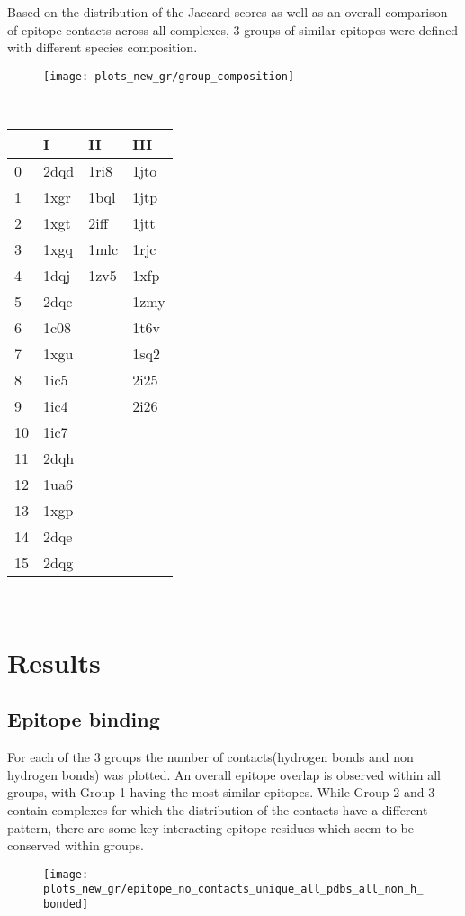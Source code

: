 \documentclass{article}
\begin{document}
Based on the distribution of the Jaccard scores as well as an overall comparison of epitope contacts across all complexes, 3 groups of similar epitopes were defined with different species composition.
\begin{figure}[h]
	\centering
	\texttt{[image: plots\_new\_gr/group\_composition]}
	\caption{}
	\label{fig:groupcomposition}
\end{figure}

\\
\begin{tabular}{llll}{}
	\toprule
	{} &     I &    II &   III \\
	\hline
	\midrule
	0  &  2dqd &  1ri8 &  1jto \\
	1  &  1xgr &  1bql &  1jtp \\
	2  &  1xgt &  2iff &  1jtt \\
	3  &  1xgq &  1mlc &  1rjc \\
	4  &  1dqj &  1zv5 &  1xfp \\
	5  &  2dqc &   &  1zmy \\
	6  &  1c08 &   &  1t6v \\
	7  &  1xgu &   &  1sq2 \\
	8  &  1ic5 &   &  2i25 \\
	9  &  1ic4 &   &  2i26 \\
	10 &  1ic7 &   &   \\
	11 &  2dqh &   &   \\
	12 &  1ua6 &   &   \\
	13 &  1xgp &   &   \\
	14 &  2dqe &   &   \\
	15 &  2dqg &   &   \\
	\bottomrule
\end{tabular}

\\

\section{Results}
\subsection{Epitope binding}

For each of the 3 groups the number of contacts(hydrogen bonds and non hydrogen bonds) was plotted. An overall epitope overlap is observed within all groups, with Group 1 having the most similar epitopes. While Group 2 and 3 contain complexes for which the distribution of the contacts have a different pattern, there are some key interacting epitope residues which seem to be conserved within groups.
\begin{figure}[h]
	\centering
	\texttt{[image: plots\_new\_gr/epitope\_no\_contacts\_unique\_all\_pdbs\_all\_non\_h\_bonded]}
	\caption{}
	\label{fig:epitopenocontactsuniqueallpdbsallnonhbonded}
\end{figure}
\\
\end{document}
